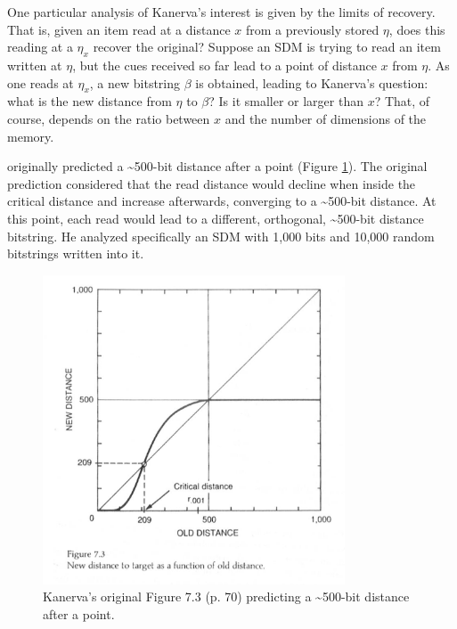 
One particular analysis of Kanerva's interest is given by the limits of recovery.  That is, given an item read at a distance $x$ from a previously stored $\eta$, does this reading at a $\eta_x$ recover the original? Suppose an SDM is trying to read an item written at $\eta$, but the cues received so far lead to a point of distance $x$ from $\eta$.  As one reads at $\eta_x$, a new bitstring $\beta$ is obtained, leading to Kanerva's question: what is the new distance from $\eta$ to $\beta$? Is it smaller or larger than $x$? That, of course, depends on the ratio between $x$ and the number of dimensions of the memory.

\citet[p.70]{Kanerva1988} originally predicted a \textasciitilde 500-bit distance after a point (Figure \ref{fig:kanerva-figure-7.3}). The original prediction considered that the read distance would decline when inside the critical distance and increase afterwards, converging to a \textasciitilde 500-bit distance.  At this point, each read would lead to a different, orthogonal, \textasciitilde 500-bit distance bitstring. He analyzed specifically an SDM with 1,000 bits and 10,000 random bitstrings written into it.

\begin{figure}[h]
\centering\includegraphics[width=0.8\textwidth]{images02/kanerva-table-7-2-original.png}
\caption{Kanerva's original Figure 7.3 (p. 70) predicting a \textasciitilde 500-bit distance after a point.
\label{fig:kanerva-figure-7.3}}
\end{figure}

